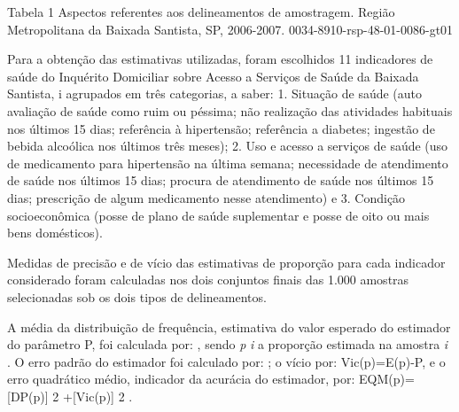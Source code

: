 \documentclass{article}
\begin{document}
Tabela 1%
Aspectos referentes aos delineamentos de amostragem. Região Metropolitana da Baixada Santista, SP, 2006-2007.%
0034-8910-rsp-48-01-0086-gt01


Para a obtenção das estimativas utilizadas, foram escolhidos 11 indicadores de saúde do Inquérito Domiciliar sobre Acesso a Serviços de Saúde da Baixada Santista,%
i%
 agrupados em três categorias, a saber: 1. Situação de saúde (auto avaliação de saúde como ruim ou péssima; não realização das atividades habituais nos últimos 15 dias; referência à hipertensão; referência a diabetes; ingestão de bebida alcoólica nos últimos três meses); 2. Uso e acesso a serviços de saúde (uso de medicamento para hipertensão na última semana; necessidade de atendimento de saúde nos últimos 15 dias; procura de atendimento de saúde nos últimos 15 dias; prescrição de algum medicamento nesse atendimento) e 3. Condição socioeconômica (posse de plano de saúde suplementar e posse de oito ou mais bens domésticos).

Medidas de precisão e de vício das estimativas de proporção para cada indicador considerado foram calculadas nos dois conjuntos finais das 1.000 amostras selecionadas sob os dois tipos de delineamentos.

A média da distribuição de frequência, estimativa do valor esperado do estimador do parâmetro P, foi calculada por: %
 , sendo %
\textit{p}
\textit{i}
 a proporção estimada na amostra%
\textit{ i}
. O erro padrão do estimador foi calculado por: %
; o vício por: Vic(p)=E(p)-P, e o erro quadrático médio, indicador da acurácia do estimador, por: EQM(p)=[DP(p)]%
2%
+[Vic(p)]%
2%
.
\end{document}
